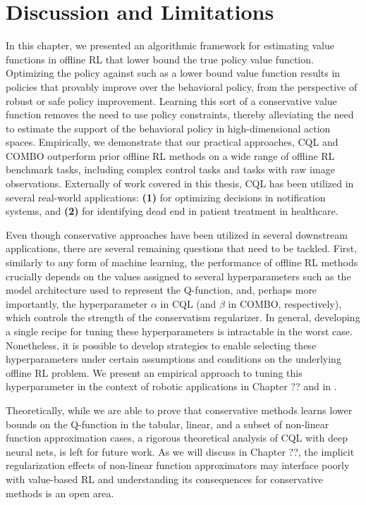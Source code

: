 \documentclass[../thesis.tex]{subfiles}
\begin{document}





\section{Discussion and Limitations}
In this chapter, we presented an algorithmic framework for estimating value functions in offline RL that lower bound the true policy value function. Optimizing the policy against such as a lower bound value function results in policies that provably improve over the behavioral policy, from the perspective of robust or safe policy improvement. Learning this sort of a conservative value function removes the need to use policy constraints, thereby alleviating the need to estimate the support of the behavioral policy in high-dimensional action spaces. Empirically, we demonstrate that our practical approaches, CQL and COMBO outperform prior offline RL methods on a wide range of offline RL benchmark tasks, including complex control tasks and tasks with raw image observations. Externally of work covered in this thesis, CQL has been utilized in several real-world applications: \textbf{(1)} for optimizing decisions in notification systems, and \textbf{(2)} for identifying dead end in patient treatment in healthcare.  

Even though conservative approaches have been utilized in several downstream applications, there are several remaining questions that need to be tackled. First, similarly to any form of machine learning, the performance of offline RL methods crucially depends on the values assigned to several hyperparameters such as the model architecture used to represent the Q-function, and, perhaps more importantly, the hyperparameter $\alpha$ in CQL (and $\beta$ in COMBO, respectively), which controls the strength of the conservatism regularizer. In general, developing a single recipe for tuning these hyperparameters is intractable in the worst case. Nonetheless, it is possible to develop strategies to enable selecting these hyperparameters under certain assumptions and conditions on the underlying offline RL problem. We present an empirical approach to tuning this hyperparameter in the context of robotic applications in Chapter ?? and in \citet{kumar2022workflow}.      

Theoretically, while we are able to prove that conservative methods learns lower bounds on the Q-function in the tabular, linear, and a subset of non-linear function approximation cases, a rigorous theoretical analysis of CQL with deep neural nets, is left for future work. As we will discuss in Chapter ??, the implicit regularization effects of non-linear function approximators may interface poorly with value-based RL and understanding its consequences for conservative methods is an open area. 
\end{document}
